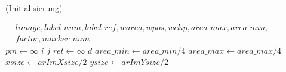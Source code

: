 \begin{algorithm}[ht]
\caption{ (Initialisierung)}
\label{alg:detectmarker2-1}
\begin{algorithmic}[1]
	\Require $
	\begin{aligned}
		& \mathit{limage}, \mathit{label\_num}, \mathit{label\_ref}, \mathit{warea}, \mathit{wpos}, \mathit{wclip}, \mathit{area\_max}, \mathit{area\_min},\\
		& \mathit{factor}, \mathit{marker\_num}
	\end{aligned}$
	\State $\mathit{pm} \gets \infty$
	\State $i$
	\State $j$
	\State $\mathit{ret} \gets \infty$
	\State $d$
	\State $\mathit{area\_min} \gets \mathit{area\_min} / 4$
	\State $\mathit{area\_max} \gets \mathit{area\_max} / 4$
	\State $\mathit{xsize} \gets \mathit{arImXsize} / 2$
	\State $\mathit{ysize} \gets \mathit{arImYsize} / 2$
\end{algorithmic}
\end{algorithm}
